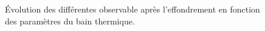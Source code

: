 	\begin{figure}[htbp]
		\centering {}
		\caption{Évolution des différentes observable après l'effondrement en fonction des paramètres du bain thermique.\label{Fig::Simu::EvoParamPostCollapse}}
	\end{figure}

	


